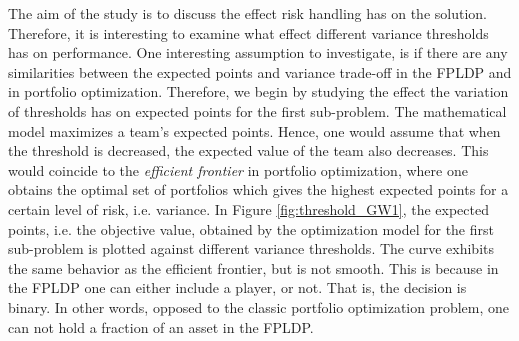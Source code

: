 \newpar

\newpar

The aim of the study is to discuss the effect risk handling has on the solution. Therefore, it is interesting to examine what effect different  variance thresholds has on performance. One interesting assumption to investigate, is if there are any similarities between the expected points and variance trade-off in the FPLDP and in portfolio optimization. Therefore, we begin by studying the effect the variation of thresholds has on expected points for the first sub-problem. The mathematical model maximizes a team's expected points. Hence, one would assume that when the threshold is decreased, the expected value of the team also decreases. This would coincide to the \textit{efficient frontier} in portfolio optimization, where one obtains the optimal set of portfolios which gives the highest expected points for a certain level of risk, i.e. variance. In Figure \ref{fig:threshold_GW1}, the expected points, i.e. the objective value, obtained by the optimization model for the first sub-problem is plotted against different variance thresholds. The curve exhibits the same behavior as the efficient frontier, but is not smooth. This is because in the FPLDP one can either include a player, or not. That is, the decision is binary. In other words, opposed to the classic portfolio optimization problem, one can not hold a fraction of an asset in the FPLDP. 
\newpar

 
